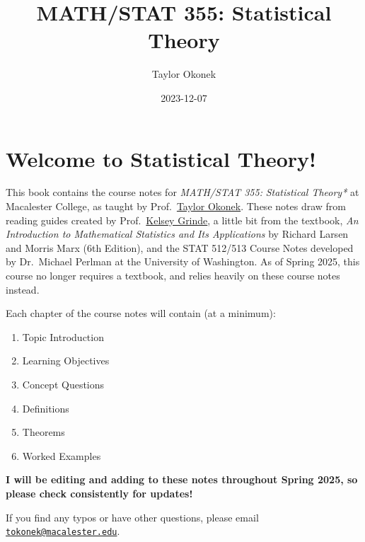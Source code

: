 \documentclass[
  letterpaper,
  DIV=11,
  numbers=noendperiod]{scrreprt}
\title{MATH/STAT 355: Statistical Theory}
\author{Taylor Okonek}
\date{2023-12-07}
\renewcommand*\contentsname{Table of contents}
\newcommand\contentsname{Table of contents}
\begin{document}
\maketitle

\renewcommand*\contentsname{Table of contents}
{
\hypersetup{linkcolor=}
\setcounter{tocdepth}{2}
\tableofcontents
}


\chapter*{Welcome to Statistical
Theory!}\label{welcome-to-statistical-theory}


This book contains the course notes for \emph{MATH/STAT 355:}
\emph{Statistical Theory*} at Macalester College, as taught by
Prof.~\href{https://taylorokonek.github.io/}{Taylor Okonek}. These notes
draw from reading guides created by
Prof.~\href{https://kegrinde.github.io/}{Kelsey Grinde}, a little bit
from the textbook, \emph{An Introduction to Mathematical Statistics and
Its Applications} by Richard Larsen and Morris Marx (6th Edition), and
the STAT 512/513 Course Notes developed by Dr.~Michael Perlman at the
University of Washington. As of Spring 2025, this course no longer
requires a textbook, and relies heavily on these course notes instead.

Each chapter of the course notes will contain (at a minimum):

\begin{enumerate}
\def\labelenumi{\arabic{enumi}.}
\item
  Topic Introduction
\item
  Learning Objectives
\item
  Concept Questions
\item
  Definitions
\item
  Theorems
\item
  Worked Examples
\end{enumerate}

\textbf{I will be editing and adding to these notes throughout Spring
2025, so please check consistently for updates!}

If you find any typos or have other questions, please email
\href{mailto:tokonek@macalester.edu}{\nolinkurl{tokonek@macalester.edu}}.
\end{document}
